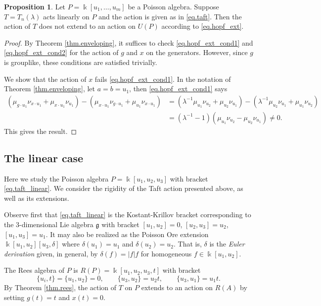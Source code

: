\documentclass[reqno]{amsart}
\numberwithin{equation}{section}
\theoremstyle{definition}
\newtheorem{proposition}[theorem]{Proposition}
\newcommand\inv{^{-1}}
\newcommand\kk{\Bbbk}
\newcommand\fg{\mathfrak g}
\begin{document}
\begin{proposition}\label{prop.taft_ext}
Let $P=\kk[u_1,\hdots,u_m]$ be a Poisson algebra. Suppose $T=T_n(\lambda)$ acts linearly on $P$ and the action is given as in \eqref{eq.taft}. Then the action of $T$ does not extend to an action on $U(P)$ according to \eqref{eq.hopf_ext}.
\end{proposition}
\begin{proof}
By Theorem \ref{thm.enveloping}, it suffices to check \eqref{eq.hopf_ext_cond1} and \eqref{eq.hopf_ext_cond2} for the action of $g$ and $x$ on the generators. However, since $g$ is grouplike, these conditions are satisfied trivially. 

We show that the action of $x$ fails \eqref{eq.hopf_ext_cond1}. In the notation of Theorem \ref{thm.enveloping}, let $a=b=u_1$, then \eqref{eq.hopf_ext_cond1} says
\begin{align*}
(\mu_{g \cdot u_1}\nu_{x \cdot u_1} + \mu_{x \cdot u_1}\nu_{u_1})
    - (\mu_{x \cdot u_1}\nu_{g \cdot u_1} + \mu_{u_1}\nu_{x \cdot u_1})
    &= (\lambda\inv \mu_{u_1}\nu_{u_2} + \mu_{u_2}\nu_{u_1})
    - (\lambda\inv\mu_{u_2}\nu_{u_1} + \mu_{u_1}\nu_{u_2}) \\
    &= (\lambda\inv -1)(\mu_{u_1}\nu_{u_2} - \mu_{u_2}\nu_{u_1}) \neq 0.
\end{align*}
This gives the result.
\end{proof}

\subsection{The linear case}

Here we study the Poisson algebra $P=\kk[u_1,u_2,u_3]$ with bracket \eqref{eq.taft_linear}. We consider the rigidity of the Taft action presented above, as well as its extensions.

Observe first that \eqref{eq.taft_linear} is the Kostant-Krillov bracket corresponding to the 3-dimensional Lie algebra $\fg$ with bracket $[u_1,u_2]=0$, $[u_2,u_3]=u_2$, $[u_1,u_3]=u_1$. It may also be realized as the Poisson Ore extension $\kk[u_1,u_2][u_3,\delta]$ where $\delta(u_1)=u_1$ and $\delta(u_2)=u_2$. That is, $\delta$ is the \emph{Euler derivation} given, in general, by $\delta(f)=|f| f$ for homogeneous $f \in \kk[u_1,u_2]$.

The Rees algebra of $P$ is $R(P)=\kk[u_1,u_2,u_3,t]$ with bracket
\[ 
    \{u_i,t\} = \{ u_1,u_2\} = 0, \qquad 
    \{u_3,u_2\} = u_2t, \qquad 
    \{u_3,u_1\} = u_1t.
\]
By Theorem \ref{thm.rees}, the action of $T$ on $P$ extends to an action on $R(A)$ by setting $g(t)=t$ and $x(t)=0$.
\end{document}
